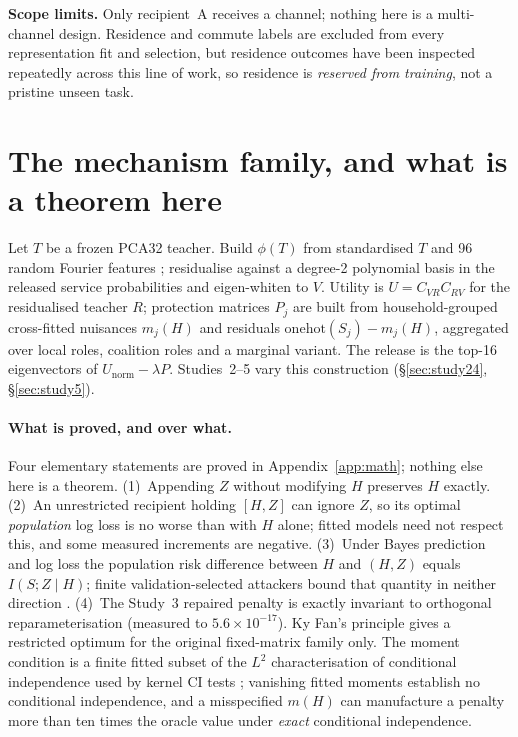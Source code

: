 \documentclass[10pt]{article}
\begin{document}
\textbf{Scope limits.} Only recipient~A receives a channel; nothing here is a multi-channel design.
Residence and commute labels are excluded from every representation fit and selection, but residence
outcomes have been inspected repeatedly across this line of work, so residence is \emph{reserved from
training}, not a pristine unseen task.

\section{The mechanism family, and what is a theorem here}
\label{sec:method}

Let $T$ be a frozen PCA32 teacher. Build $\phi(T)$ from standardised $T$ and 96 random Fourier features
\citep{rahimi2007random}; residualise against a degree-2 polynomial basis in the released service
probabilities and eigen-whiten to $V$. Utility is $U=C_{VR}C_{RV}$ for the residualised teacher $R$;
protection matrices $P_j$ are built from household-grouped cross-fitted nuisances $m_j(H)$
\citep{chernozhukov2016dml} and residuals $\mathrm{onehot}(S_j)-m_j(H)$, aggregated over local roles,
coalition roles and a marginal variant. The release is the top-16 eigenvectors of $U_{\mathrm{norm}}-\lambda P$.
Studies~2--5 vary this construction (\S\ref{sec:study24}, \S\ref{sec:study5}).

\paragraph{What is proved, and over what.} Four elementary statements are proved in
Appendix~\ref{app:math}; nothing else here is a theorem. (1)~Appending $Z$ without modifying $H$
preserves $H$ exactly. (2)~An unrestricted recipient holding $[H,Z]$ can ignore $Z$, so its optimal
\emph{population} log loss is no worse than with $H$ alone; fitted models need not respect this, and some
measured increments are negative. (3)~Under Bayes prediction and log loss the population risk difference
between $H$ and $(H,Z)$ equals $I(S;Z\mid H)$; finite validation-selected attackers bound that quantity in
neither direction \citep{mcallester2020formal}. (4)~The Study~3 repaired penalty is exactly invariant to
orthogonal reparameterisation (measured to $5.6\times10^{-17}$). Ky Fan's principle \citep{fan1949weyl}
gives a restricted optimum for the original fixed-matrix family only. The moment condition is a finite
fitted subset of the $L^2$ characterisation of conditional independence used by kernel CI tests
\citep{zhang2011kci,strobl2019rcit}; vanishing fitted moments establish no conditional independence, and a
misspecified $m(H)$ can manufacture a penalty more than ten times the oracle value under \emph{exact}
conditional independence.
\end{document}
